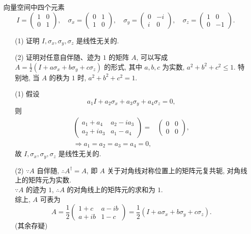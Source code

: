 \documentclass{assignment}
\begin{document}
\begin{prob}
    向量空间中四个元素
    \[
        I=\begin{pmatrix}
            1&0\\
            0&1
        \end{pmatrix},\quad\sigma_x=\begin{pmatrix}
            0&1\\
            1&0
        \end{pmatrix},\quad\sigma_y=\begin{pmatrix}
            0&-i\\
            i&0
        \end{pmatrix},\quad\sigma_z=\begin{pmatrix}
            1&0\\
            0&-1
        \end{pmatrix}.
    \]
    \begin{itemize}
        \item[(1)] 证明 $I,\sigma_x,\sigma_y,\sigma_z$ 是线性无关的.
        \item[(2)] 证明对任意自伴随、迹为 $1$ 的矩阵 $A$, 可以写成 $A=\frac{1}{2}(I+a\sigma_x+b\sigma_y+c\sigma_z)$ 的形式, 其中 $a,b,c$ 为实数, $a^2+b^2+c^2\leq 1$. 特别地, 当 $A$ 的秩为 $1$ 时, $a^2+b^2+c^2=1$.
    \end{itemize}
\end{prob}
\begin{pf}
    \begin{itemize}
        \item[(1)] 假设
        \[
            a_1I+a_2\sigma_x+a_3\sigma_y+a_4\sigma_z=0,
        \]
        则
        \begin{gather*}
            \begin{pmatrix}
                a_1+a_4&a_2-ia_3\\
                a_2+ia_3&a_1-a_4
            \end{pmatrix}=&\begin{pmatrix}
                0&0\\
                0&0
            \end{pmatrix},\\
            \Longrightarrow a_1=a_2=a_3=a_4=0,
        \end{gather*}
        故 $I,\sigma_x,\sigma_y,\sigma_z$ 是线性无关的.
        \item[(2)] $\because A$ 自伴随, $\therefore A^{\dagger}=A$, 即 $A$ 关于对角线对称位置上的矩阵元复共轭, 对角线上的矩阵元为实数.\\
        $\because A$ 的迹为 $1$, $\therefore A$ 的对角线上的矩阵元的求和为 $1$.\\
        综上, $A$ 可表为
        \[
            A=\frac{1}{2}\begin{pmatrix}
                1+c&a-ib\\
                a+ib&1-c
            \end{pmatrix}=\frac{1}{2}(I+a\sigma_x+b\sigma_y+c\sigma_z).
        \]
        (其余存疑)
    \end{itemize}
\end{pf}
\end{document}
